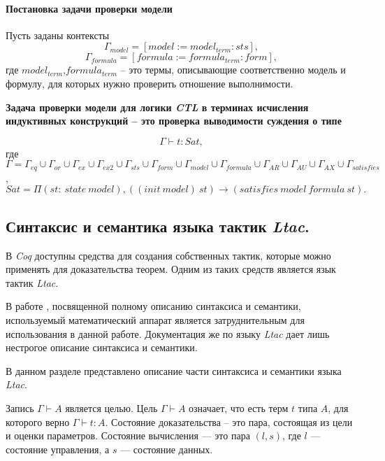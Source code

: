 \documentclass[12pt]{article}
\begin{document}
\paragraph{Постановка задачи проверки модели}\mbox{}

Пусть заданы контексты 
$$\Gamma_{model} = [model:=model_{term}:sts],$$ 
$$\Gamma_{formula} = [ formula :=formula_{term}:form],$$ где $model_{term}$,$formula_{term}$ -- это термы, описывающие соответственно модель и формулу, для которых нужно проверить отношение выполнимости.
 
\textbf{Задача проверки модели для логики \textit{CTL} в терминах исчисления индуктивных конструкций -- это проверка выводимости суждения о типе}

$$\Gamma \vdash t: Sat,$$
где
$\Gamma=\Gamma_{eq} \cup \Gamma_{or} \cup \Gamma_{ex} \cup \Gamma_{ex2} \cup \Gamma_{sts} \cup \Gamma_{form}\cup \Gamma_{model} \cup \Gamma_{formula} \cup \Gamma_{AR} \cup \Gamma_{AU} \cup \Gamma_{AX} \cup \Gamma_{satisfies}$,
$Sat= \Pi (st:\ state\ model), ((init\ model)\ st) \xrightarrow{} (satisfies\ model\ formula\ st).$


\subsection{Синтаксис и семантика языка тактик \textit{Ltac}.}

В \textit{Coq} доступны средства для создания собственных тактик, которые можно применять для доказательства теорем. Одним из таких средств является язык тактик \textit{Ltac}. 

В работе \cite{LtacFull}, посвященной  полному описанию синтаксиса и семантики, используемый математический аппарат является затруднительным для использования в данной работе. Документация же по языку \textit{Ltac} \cite{lib} дает лишь нестрогое описание синтаксиса и семантики.

В данном разделе представлено описание части синтаксиса и семантики языка \textit{Ltac}.

Запись $\Gamma \vdash A$ является целью. Цель $\Gamma \vdash A$ означает, что есть терм $t$ типа $A$, для которого верно  $\Gamma \vdash t: A$. 
Состояние доказательства -- это пара, состоящая из цели и оценки параметров. Состояние вычисления — это пара $(l, s)$, где $l$ — состояние управления, а $s$ — состояние данных.
\end{document}
